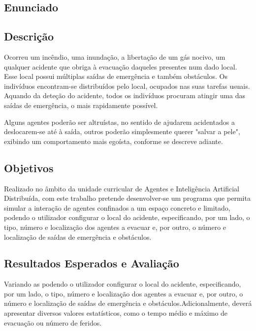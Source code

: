 \documentclass[12pt]{article}
\begin{document}
\begin{titlepage}
\newpage

\section{Enunciado}

\subsection{Descrição}

Ocorreu um incêndio, uma inundação, a libertação de um gás nocivo, um qualquer acidente que obriga à evacuação daqueles presentes num dado local. Esse local possui múltiplas saídas de emergência e também obstáculos. Os indivíduos encontram-se distribuídos pelo local, ocupados nas suas tarefas usuais. Aquando da deteção do acidente, todos os indivíduos procuram atingir uma das saídas de emergência, o mais rapidamente possível.

Alguns agentes poderão ser altruístas, no sentido de ajudarem acidentados a deslocarem-se até à saída, outros poderão simplesmente querer "salvar a pele", exibindo um comportamento mais egoísta, conforme se descreve adiante.


\subsection{Objetivos}

Realizado no âmbito da unidade curricular de Agentes e Inteligência Artificial Distribuída, com este trabalho pretende desenvolver-se um programa que permita simular a interação de agentes confinados a um espaço concreto e limitado, podendo o utilizador configurar o local do acidente, especificando, por um lado, o tipo, número e localização dos agentes a evacuar e, por outro, o número e localização de saídas de emergência e obstáculos.


\subsection{Resultados Esperados e Avaliação}

Variando as podendo o utilizador configurar o local do acidente, especificando, por um lado, o tipo, número e localização dos agentes a evacuar e, por outro, o número e localização de saídas de emergência e obstáculos.Adicionalmente, deverá apresentar diversos valores estatísticos, como o tempo médio e máximo de evacuação ou número de feridos.


\end{titlepage}
\end{document}
